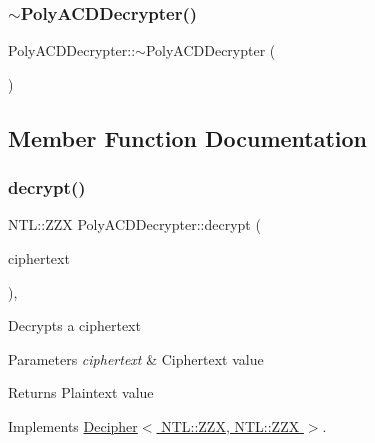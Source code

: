 \mbox{\label{classPolyACDDecrypter_a91c523391a2d25bd27160ef045f19c79}} 
\subsubsection{\texorpdfstring{$\sim$\+Poly\+A\+C\+D\+Decrypter()}{~PolyACDDecrypter()}}
{\footnotesize\ttfamily Poly\+A\+C\+D\+Decrypter\+::$\sim$\+Poly\+A\+C\+D\+Decrypter (\begin{DoxyParamCaption}{ }\end{DoxyParamCaption})\hspace{0.3cm}{\ttfamily [virtual]}}



\subsection{Member Function Documentation}
\mbox{\label{classPolyACDDecrypter_a96626f2c267d9cc4b18ed25cb584d982}} 
\subsubsection{\texorpdfstring{decrypt()}{decrypt()}}
{\footnotesize\ttfamily N\+T\+L\+::\+Z\+ZX Poly\+A\+C\+D\+Decrypter\+::decrypt (\begin{DoxyParamCaption}\item[{N\+T\+L\+::\+Z\+ZX \&}]{ciphertext }\end{DoxyParamCaption})\hspace{0.3cm}{\ttfamily [override]}, {\ttfamily [virtual]}}

Decrypts a ciphertext 
\begin{DoxyParams}{Parameters}
{\em ciphertext} & Ciphertext value \\
\hline
\end{DoxyParams}
\begin{DoxyReturn}{Returns}
Plaintext value 
\end{DoxyReturn}


Implements \hyperlink{classDecipher_ac6b8c369eda2d7e17fa90cb594cf41b6}{Decipher$<$ N\+T\+L\+::\+Z\+Z\+X, N\+T\+L\+::\+Z\+Z\+X $>$}.


